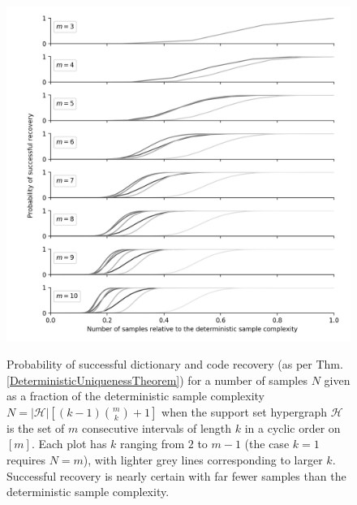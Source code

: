 







\begin{figure}\label{probpigeon}
\begin{center}
\includegraphics[width=1 \linewidth]{figures/prob_vs_samples.png}
\caption{Probability of successful dictionary and code recovery (as per Thm. \ref{DeterministicUniquenessTheorem}) for a number of samples $N$ given as a fraction of the deterministic sample complexity $N = |\mathcal{H}|[(k-1){m \choose k} + 1]$ when the support set hypergraph $\mathcal{H}$ is the set of $m$ consecutive intervals of length $k$ in a cyclic order on $[m]$. Each plot has $k$ ranging from $2$ to $m-1$ (the case $k=1$ requires $N=m$), with lighter grey lines corresponding to larger $k$. Successful recovery is nearly certain with far fewer samples than the deterministic sample complexity. }
\vspace{-.6 cm}
\label{probvsamples}
\end{center}
\end{figure}

